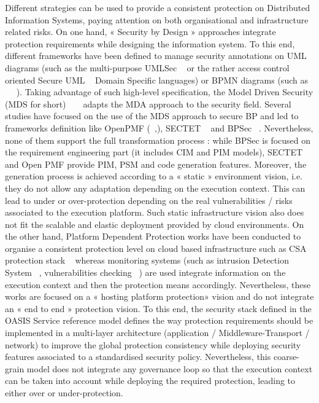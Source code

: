 \documentclass[runningheads,a4paper]{llncs}
\begin{document}
Different strategies can be used to provide a consistent protection on Distributed Information Systems, paying attention on both organisational and infrastructure related risks. On one hand, « Security by Design » approaches integrate protection requirements while designing the information system. To this end, different frameworks have been defined to manage security annotations on UML diagrams (such as the multi-purpose UMLSec ~\cite{JJ02} or the rather access control oriented  Secure UML ~\cite{LBD02} Domain Specific languages) or BPMN diagrams (such as ~\cite{WMS09} ~\cite{SSL09}). Taking advantage of such high-level specification, the Model Driven Security (MDS for short)  ~\cite{LS09} ~\cite{LZN14} adapts the MDA approach to the security field. Several studies have focused on the use of the MDS approach to secure BP and led to frameworks definition like OpenPMF (~\cite{LU10},), SECTET ~\cite{AHB08} and BPSec ~\cite{RFP07}. Nevertheless, none of them support the full transformation process : while BPSec is focused on the requirement engineering part (it includes CIM and PIM models), SECTET and Open PMF provide PIM, PSM and code generation features. Moreover, the generation process is achieved according to a « static » environment vision, i.e. they do not allow any adaptation depending on the execution context. This can lead to under or over-protection depending on the real vulnerabilities / risks associated to the execution platform. Such static infrastructure vision also does not fit the scalable and elastic deployment provided by cloud environments.
On the other hand, Platform Dependent Protection works have been conducted to organise a consistent protection level on cloud based infrastructure such as CSA protection stack ~\cite{CSA11} whereas monitoring systems (such as intrusion Detection System ~\cite{MPB12}, vulnerabilities checking ~\cite{AVG11}) are used integrate information on the execution context  and then the protection means accordingly. Nevertheless, these works are focused on a « hosting platform protection» vision and do not integrate an « end to end » protection vision. To this end, the security stack defined in the  OASIS Service reference model defines the way protection requirements should be implemented in a multi-layer architecture (application / Middleware-Transport / network) to improve the global protection consistency while deploying security features associated to a standardised security policy. Nevertheless, this coarse-grain model does not integrate any governance loop so that the execution context can be taken into account while deploying the required protection, leading to either over or under-protection.
\end{document}

